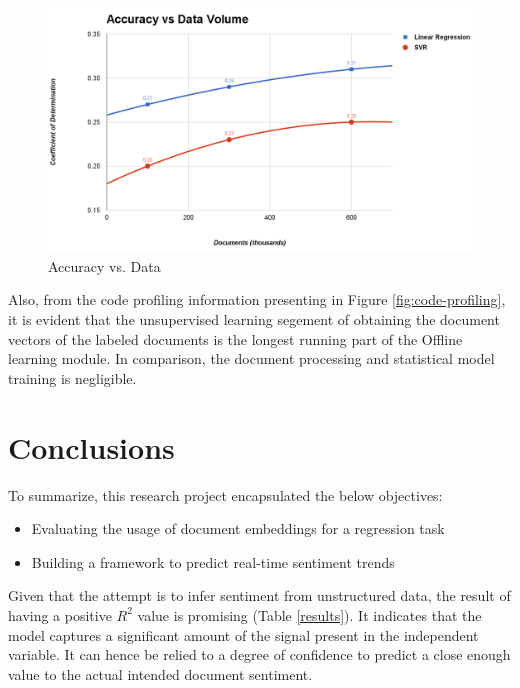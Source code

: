 \documentclass[conference]{IEEEtran}
\begin{document}
    \begin{figure}[ht]
        \centering
        \includegraphics[width=\textwidth]{images/accuracy-vs-data.png}
        \caption{Accuracy vs. Data}
        \label{fig:accuracy-v-data}
    \end{figure}

    Also, from the code profiling information presenting in Figure \ref{fig:code-profiling}, it is evident that the unsupervised learning segement of obtaining the document vectors of the labeled documents is the longest running part of the Offline learning module. In comparison, the document processing and statistical model training is negligible.

\vspace{5mm}

\section{Conclusions}
To summarize, this research project encapsulated the below objectives:
    \begin{itemize}
        \item Evaluating the usage of document embeddings for a regression task
        \item Building a framework to predict real-time sentiment trends
    \end{itemize}

Given that the attempt is to infer sentiment from unstructured data, the result of having a positive $R^2$ value is promising (Table \ref{results}).
It indicates that the model captures a significant amount of the signal present in the independent variable.
It can hence be relied to a degree of confidence to predict a close enough value to the actual intended document sentiment.
\end{document}
